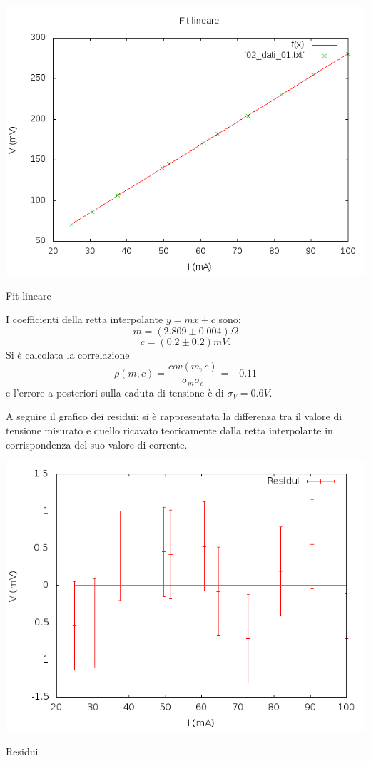 \documentclass[11pt,a4paper]{article} %
\begin{document}
{\begin{grafico}
\centering
\includegraphics[width=\textwidth]{02_fitlin}
\caption{Fit lineare}
\label{fig:fitlin}
\end{grafico}

I coefficienti della retta interpolante $y=mx+c$ sono:
\[m = (2.809 \pm 0.004) \Omega \]
\[c = (0.2 \pm 0.2) mV.\]
Si \`e calcolata la correlazione 
\[\rho(m, c) = \frac{cov(m, c)}{\sigma_m \sigma_c}=-0.11\]
e l'errore a posteriori sulla caduta di tensione \`e di $\sigma_V=0.6V$.

A seguire il grafico dei residui: si \`e rappresentata la differenza tra il valore di tensione misurato e quello ricavato teoricamente dalla retta interpolante in corrispondenza del suo valore di corrente.

\begin{grafico}
\centering
\includegraphics[width=\textwidth]{02_residui}
\caption{Residui}
\label{fig:residui}
\end{grafico}

}
\end{document}
